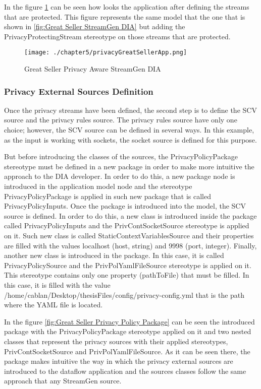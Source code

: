 In the figure \ref{fig:Great Seller Privacy Aware StreamGen DIA} can be seen how looks the application after defining the streams that are protected. This figure represents the same model that the one that is shown in \ref{fig:Great Seller StreamGen DIA} but adding the PrivacyProtectingStream stereotype on those streams that are protected.

\begin{figure}
\centering
{\texttt{[image: ./chapter5/privacyGreatSellerApp.png]}}
\caption{Great Seller Privacy Aware StreamGen DIA}
\label{fig:Great Seller Privacy Aware StreamGen DIA}
\end{figure}

\subsubsection{Privacy External Sources Definition}

Once the privacy streams have been defined, the second step is to define the SCV source and the privacy rules source. The privacy rules source have only one choice; however, the SCV source can be defined in several ways. In this example, as the input is working with sockets, the socket source is defined for this purpose.

But before introducing the classes of the sources, the PrivacyPolicyPackage stereotype must be defined in a new package in order to make more intuitive the approach to the DIA developer. In order to do this, a new package node is introduced in the application model node and the stereotype PrivacyPolicyPackage is applied in such new package that is called PrivacyPolicyInputs. Once the package is introduced into the model, the SCV source is defined. In order to do this, a new class is introduced inside the package called PrivacyPolicyInputs and the PrivContSocketSource stereotype is applied on it. Such new class is called StaticContextVariablesSource and their properties are filled with the values localhost (host, string) and 9998 (port, integer). Finally, another new class is introduced in the package. In this case, it is called PrivacyPolicySource and the PrivPolYamlFileSource stereotype is applied on it. This stereotype contains only one property (pathToFile) that must be filled. In this case, it is filled with the value /home/cablan/Desktop/thesisFiles/config/privacy-config.yml that is the path where the YAML file is located.

In the figure \ref{fig:Great Seller Privacy Policy Package} can be seen the introduced package with the PrivacyPolicyPackage stereotype applied on it and two nested classes that represent the privacy sources with their applied stereotypes, PrivContSocketSource and PrivPolYamlFileSource. As it can be seen there, the package makes intuitive the way in which the privacy external sources are introduced to the dataflow application and the sources classes follow the same approach that any StreamGen source. 

